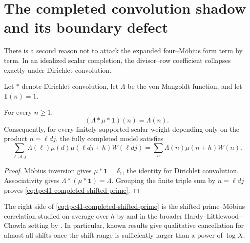 \section{The completed convolution shadow and its boundary defect}
\label{sec:tpc41-convolution}

There is a second reason not to attack the expanded four--M\"obius form
term by term.  In an idealized scalar completion, the divisor--row
coefficient collapses exactly under Dirichlet convolution.

Let \(*\) denote Dirichlet convolution, let \(\Lambda\) be the von
Mangoldt function, and let \(\mathbf 1(n)=1\).

\begin{proposition}
\label{prop:tpc41-full-convolution}
For every \(n\ge1\),
\begin{equation}
 \boxed{
 (\Lambda*\mu*\mathbf1)(n)=\Lambda(n).}
 \label{eq:tpc41-full-convolution}
\end{equation}
Consequently, for every finitely supported scalar weight depending only on
the product \(n=\ell dj\), the fully completed model satisfies
\begin{equation}
 \sum_{\ell,d,j}
 \Lambda(\ell)\mu(d)
 \mu(\ell dj+h)W(\ell dj)
 =\sum_n\Lambda(n)\mu(n+h)W(n).
 \label{eq:tpc41-completed-shifted-prime}
\end{equation}
\end{proposition}

\begin{proof}
M\"obius inversion gives \(\mu*\mathbf1=\delta_1\), the identity for
Dirichlet convolution.  Associativity gives
\(\Lambda*(\mu*\mathbf1)=\Lambda\).  Grouping the finite triple sum by
\(n=\ell dj\) proves \eqref{eq:tpc41-completed-shifted-prime}.
\end{proof}

The right side of \eqref{eq:tpc41-completed-shifted-prime} is the shifted
prime--M\"obius correlation studied on average over \(h\) by
\citet{Lichtman2022} and in the broader Hardy--Littlewood--Chowla setting
by \citet{LichtmanTeravainen2022}.  In particular, known results give
qualitative cancellation for almost all shifts once the shift range is
sufficiently larger than a power of \(\log X\).

